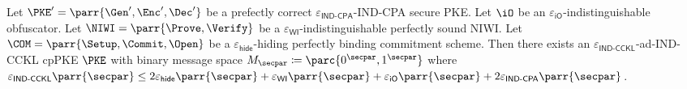 \begin{theorem}
    Let \(\PKE' = \parr{\Gen',\Enc',\Dec'}\) be a prefectly correct \(\varepsilon_{\textsf{IND-CPA}}\)-IND-CPA secure PKE.
    Let \(\iO\) be an \(\varepsilon_{\textsf{iO}}\)-indistinguishable obfuscator.
    Let \(\NIWI = \parr{\Prove,\Verify}\) be a \(\varepsilon_{\textsf{WI}}\)-indistinguishable perfectly sound NIWI.
    Let \(\COM = \parr{\Setup,\Commit,\Open}\) be a \(\varepsilon_{\textsf{hide}}\)-hiding perfectly binding commitment scheme.
    Then there exists an \(\varepsilon_{\textsf{IND-CCKL}}\)-ad-IND-CCKL cpPKE \(\PKE\) with binary message space \(M_\secpar \coloneq \parc{0^\secpar,1^\secpar}\) where \(\varepsilon_{\textsf{IND-CCKL}}\parr{\secpar} \leq 2\varepsilon_{\textsf{hide}}\parr{\secpar} + \varepsilon_{\textsf{WI}}\parr{\secpar} + \varepsilon_{\textsf{iO}}\parr{\secpar} + 2\varepsilon_{\textsf{IND-CPA}}\parr{\secpar}\).
\end{theorem}

